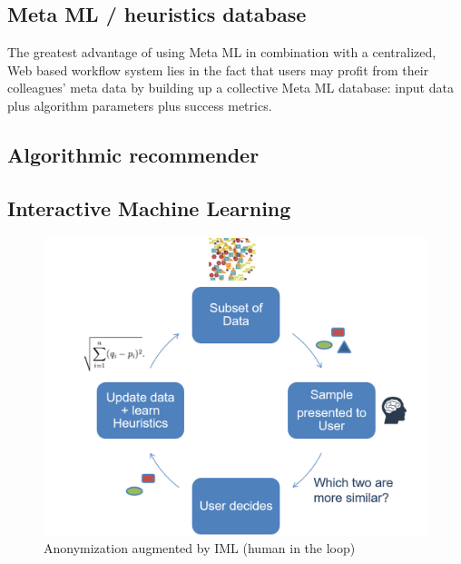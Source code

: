 \subsection{Meta ML / heuristics database}
\label{ssect:heuristics}

The greatest advantage of using Meta ML in combination with a centralized, Web based workflow system lies in the fact that users may profit from their colleagues' meta data by building up a collective Meta ML database: input data plus algorithm parameters plus success metrics.


\subsection{Algorithmic recommender}
\label{ssect:algo_recommender}


\subsection{Interactive Machine Learning}
\label{ssect:fut_iml}

\begin{figure}[ht]
	\begin{center}
		\includegraphics[width=1\textwidth]{figures/anonym/anonIML}
		\caption{Anonymization augmented by IML (human in the loop)}
		\label{fig:anonIML}
	\end{center}
\end{figure}

